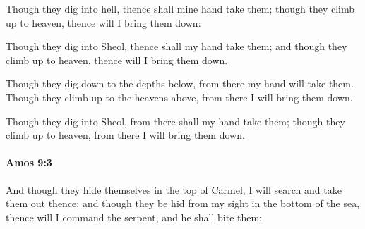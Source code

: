 			Though they dig into hell, thence shall mine hand take them; though they climb up to heaven, thence will I bring them down:

			\begin{versebox}
					\item[BHS] 
					\item[LXX] 
					\item[ASV] Though they dig into Sheol, thence shall my hand take them; and though they climb up to heaven, thence will I bring them down.
					\item[NIV] Though they dig down to the depths below, from there my hand will take them. Though they climb up to the heavens above, from there I will bring them down.
					\item[NRSV] Though they dig into Sheol, from there shall my hand take them; though they climb up to heaven, from there I will bring them down.
			\end{versebox}

		\paragraph{Amos 9:3} %
			\label{AMOS-9-3}

			And though they hide themselves in the top of Carmel, I will search and take them out thence; and though they be hid from my sight in the bottom of the sea, thence will I command the serpent, and he shall bite them:

